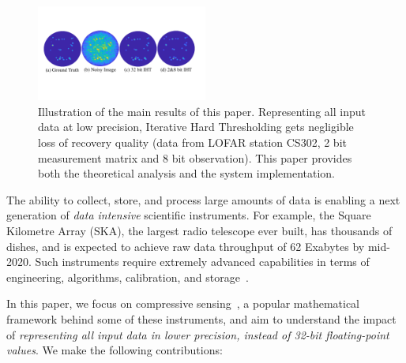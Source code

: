 \documentclass{article}
\begin{document}
\begin{figure}
\vspace{-3em}
  \label{sky_images}
  \centering
    \includegraphics[width=0.5\textwidth]{figs/sky_images_nips.pdf}
  \vspace{-2em}
  \caption{Illustration of the main results of this paper. Representing all input data at 
  low precision, Iterative Hard Thresholding gets negligible loss of recovery quality (data from LOFAR station CS302, 2 bit measurement matrix and 8 bit observation). This paper provides both  the theoretical analysis and the system implementation.}
  \label{fig:sky_images}
  \vspace{-1em}
\end{figure}


The ability to collect, store, and process large amounts of
data is enabling a next generation of {\em data intensive} scientific 
instruments. For example,
the Square Kilometre Array (SKA), the largest
radio telescope ever built, has thousands of 
dishes, and is expected to achieve
raw data throughput of 62 Exabytes by mid-2020.
Such instruments require extremely advanced  
capabilities in terms of engineering, algorithms, calibration, and storage~\cite{hu}. 




In this paper, we focus on compressive sensing~\cite{donoho2006cs, candes2006cs, candes2006cs2}, a popular mathematical framework behind some of these instruments, and aim to understand 
the impact of {\em representing all input data
in lower precision, instead of 32-bit floating-point values}. 
We make the following contributions:
\end{document}
